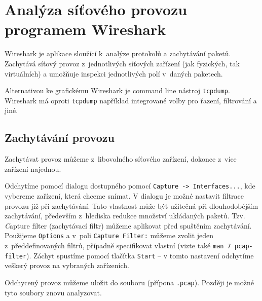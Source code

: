 
\section{Analýza síťového provozu programem Wireshark}
\label{wireshark}

Wireshark je aplikace sloužící k~analýze protokolů a zachytávání paketů. Zachytává síťový provoz z~jednotlivých síťových zařízení (jak fyzických, tak virtuálních) a umožňuje inspekci jednotlivých polí v~daných paketech.

Alternativou ke grafickému Wireshark je command line nástroj \texttt{tcpdump}. Wireshark má oproti \texttt{tcpdump} například integrované volby pro řazení, filtrování a jiné.


\subsection{Zachytávání provozu}
Zachytávat provoz můžeme z~libovolného síťového zařízení, dokonce z~více zařízení najednou.

Odchytíme pomocí dialogu dostupného pomocí \texttt{Capture -> Interfaces...},
kde vybereme zařízení, která chceme snímat.
V dialogu je možné nastavit filtrace provozu již při zachytávání. Tato vlastnost může být užitečná při dlouhodobějším zachytávání, především z~hlediska redukce množství ukládaných paketů.
Tzv. {\emph Capture filter} (zachytávací filtr) můžeme aplikovat před spuštěním
zachytávání. Použijeme \texttt{Options} a v~poli \texttt{Capture Filter:} můžeme
zvolit jeden z~předdefinovaných filtrů, případně specifikovat vlastní (vizte
také \texttt{man 7 pcap-filter}).
Záchyt spustíme pomocí tlačítka
\texttt{Start} -- v tomto nastavení odchytíme veškerý provoz na vybraných zařízeních.

Odchycený provoz můžeme uložit do souboru (přípona \texttt{.pcap}). Později je možné tyto soubory znovu analyzovat.


